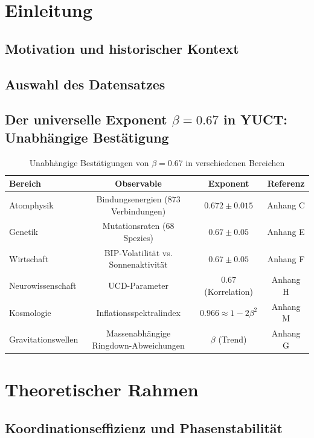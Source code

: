 \documentclass[12pt,a4paper]{article}
\theoremstyle{remark}
\begin{document}
	\newpage
	\section{Einleitung}
	\subsection{Motivation und historischer Kontext}
	\subsection{Auswahl des Datensatzes}
	\subsection{Der universelle Exponent \(\beta = 0.67\) in YUCT: Unabhängige Bestätigung}
	
	\begin{table}[htbp]
		\centering
		\caption{Unabhängige Bestätigungen von \(\beta = 0.67\) in verschiedenen Bereichen}
		\label{tab:beta_confirmation}
		\begin{tabular}{@{}lccc@{}}
			\toprule
			\textbf{Bereich} & \textbf{Observable} & \textbf{Exponent} & \textbf{Referenz} \\
			\midrule
			Atomphysik & Bindungsenergien (873 Verbindungen) & \(0.672\pm0.015\) & Anhang C \\
			Genetik & Mutationsraten (68 Spezies) & \(0.67\pm0.05\) & Anhang E \\
			Wirtschaft & BIP-Volatilität vs. Sonnenaktivität & \(0.67\pm0.05\) & Anhang F \\
			Neurowissenschaft & UCD-Parameter & \(0.67\) (Korrelation) & Anhang H \\
			Kosmologie & Inflationsspektralindex & \(0.966 \approx 1-2\beta^2\) & Anhang M \\
			Gravitationswellen & Massenabhängige Ringdown-Abweichungen & \(\beta\) (Trend) & Anhang G \\
			\bottomrule
		\end{tabular}
	\end{table}
	
	\section{Theoretischer Rahmen}
	\subsection{Koordinationseffizienz und Phasenstabilität}
\end{document}
